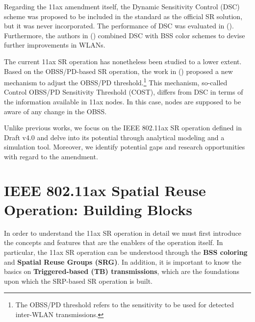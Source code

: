 \documentclass[preprint,12pt]{elsarticle}
\begin{document}
	Regarding the 11ax amendment itself, the Dynamic Sensitivity Control (DSC) scheme was proposed to be included in the standard as the official SR solution, but it was never incorporated. The performance of DSC was evaluated in (\citealp{afaqui2015evaluation, afaqui2016dynamic, kulkarni2015taming}). Furthermore, the authors in (\citealp{selinis2016evaluation, selinis2017exploiting}) combined DSC with BSS color schemes to devise further improvements in WLANs.
	
	The current 11ax SR operation has nonetheless been studied to a lower extent. Based on the OBSS/PD-based SR operation, the work in (\citealp{selinis2018control}) proposed a new mechanism to adjust the OBSS/PD threshold.\footnote{The OBSS/PD threshold refers to the sensitivity to be used for detected inter-WLAN transmissions.} This mechanism, so-called Control OBSS/PD Sensitivity Threshold (COST), differs from DSC in terms of the information available in 11ax nodes. In this case, nodes are supposed to be aware of any change in the OBSS. 
	
	Unlike previous works, we focus on the IEEE 802.11ax SR operation defined in Draft v4.0 and delve into its potential through analytical modeling and a simulation tool. Moreover, we identify potential gaps and research opportunities with regard to the amendment.
	
	\section{IEEE 802.11ax Spatial Reuse Operation: Building Blocks}
	\label{section:enablers_sr_11ax}
	In order to understand the 11ax SR operation in detail we must first introduce the concepts and features that are the enablers of the operation itself. In particular, the 11ax SR operation can be understood through the \textbf{BSS coloring} and \textbf{Spatial Reuse Groups (SRG)}. In addition, it is important to know the basics on \textbf{Triggered-based (TB) transmissions}, which are the foundations upon which the SRP-based SR operation is built.
	
\end{document}
